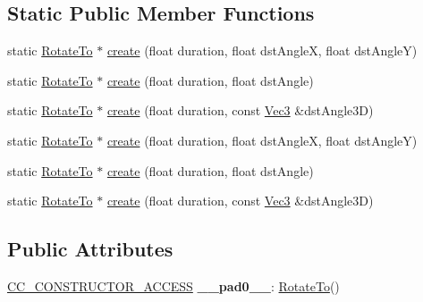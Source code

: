 \subsection*{Static Public Member Functions}
\begin{DoxyCompactItemize}
\item 
static \hyperlink{classRotateTo}{Rotate\+To} $\ast$ \hyperlink{classRotateTo_a3a686ec57d37904ce567532b5c402706}{create} (float duration, float dst\+AngleX, float dst\+AngleY)
\item 
static \hyperlink{classRotateTo}{Rotate\+To} $\ast$ \hyperlink{classRotateTo_accb8d414bda237e6e6ba126d4549a104}{create} (float duration, float dst\+Angle)
\item 
static \hyperlink{classRotateTo}{Rotate\+To} $\ast$ \hyperlink{classRotateTo_aa75725b759f446f9f972ebd2f66b5870}{create} (float duration, const \hyperlink{classVec3}{Vec3} \&dst\+Angle3D)
\item 
static \hyperlink{classRotateTo}{Rotate\+To} $\ast$ \hyperlink{classRotateTo_afb446dd3bffc41a303871e177d5ae0a0}{create} (float duration, float dst\+AngleX, float dst\+AngleY)
\item 
static \hyperlink{classRotateTo}{Rotate\+To} $\ast$ \hyperlink{classRotateTo_a97900b213107e0fb11fd0d8509d5e24c}{create} (float duration, float dst\+Angle)
\item 
static \hyperlink{classRotateTo}{Rotate\+To} $\ast$ \hyperlink{classRotateTo_af4cf52ca1ddc34b8df22d1614554df37}{create} (float duration, const \hyperlink{classVec3}{Vec3} \&dst\+Angle3D)
\end{DoxyCompactItemize}
\subsection*{Public Attributes}
\begin{DoxyCompactItemize}
\item 
\mbox{\label{classRotateTo_ad61e21b7e11f981ef777721701ac5bc9}} 
\hyperlink{_2cocos2d_2cocos_2base_2ccConfig_8h_a25ef1314f97c35a2ed3d029b0ead6da0}{C\+C\+\_\+\+C\+O\+N\+S\+T\+R\+U\+C\+T\+O\+R\+\_\+\+A\+C\+C\+E\+SS} {\bfseries \+\_\+\+\_\+pad0\+\_\+\+\_\+}\+: \hyperlink{classRotateTo}{Rotate\+To}()
\end{DoxyCompactItemize}
